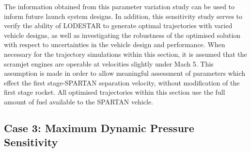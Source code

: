 The information obtained from this parameter variation study can be used to inform future launch system designs. 
In addition, this sensitivity study serves to verify the ability of LODESTAR to generate optimal trajectories with varied vehicle designs, as well as investigating the robustness of the optimised solution with respect to uncertainties in the vehicle design and performance.
When necessary for the trajectory simulations within this section, it is assumed that the scramjet engines are operable at velocities slightly under Mach 5. This assumption is made in order to allow meaningful assessment of parameters which effect the first stage-SPARTAN separation velocity, without modification of the first stage rocket.
All optimised trajectories within this section use the full amount of fuel available to the SPARTAN vehicle. 


\subsection{Case 3: Maximum Dynamic Pressure Sensitivity}\label{sec:qvariation}


